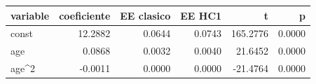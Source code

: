 \begin{tabular}{lrrrrr}
\toprule
variable & coeficiente & EE clasico & EE HC1 & t & p \\
\midrule
const & 12.2882 & 0.0644 & 0.0743 & 165.2776 & 0.0000 \\
age & 0.0868 & 0.0032 & 0.0040 & 21.6452 & 0.0000 \\
age\textasciicircum 2 & -0.0011 & 0.0000 & 0.0000 & -21.4764 & 0.0000 \\
\bottomrule
\end{tabular}
